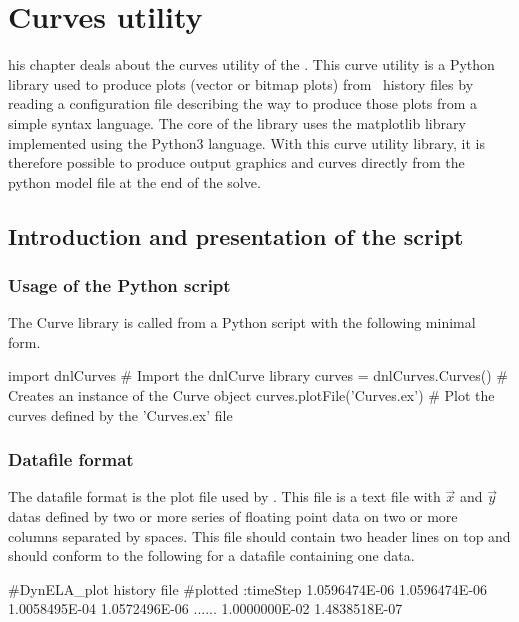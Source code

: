 
\chapter{Curves utility}

\startcontents[chapters]
\printmyminitoc[1]his chapter deals about the curves utility of the \Dynela.
This curve utility is a Python library used to produce plots (vector
or bitmap plots) from \Dynela~history files by reading a configuration
file describing the way to produce those plots from a simple syntax
language. The core of the library uses the matplotlib library implemented
using the Python3 language. With this curve utility library, it is
therefore possible to produce output graphics and curves directly
from the python model file at the end of the solve.

\section{Introduction and presentation of the script}

\subsection{Usage of the Python script}

The Curve library is called from a Python script with the following
minimal form.

\begin{PythonListing}
import dnlCurves              # Import the dnlCurve library
curves = dnlCurves.Curves()   # Creates an instance of the Curve object
curves.plotFile('Curves.ex')  # Plot the curves defined by the 'Curves.ex' file
\end{PythonListing}

\subsection{Datafile format}

The datafile format is the plot file used by \Dynela. This file is
a text file with $\overrightarrow{x}$ and $\overrightarrow{y}$ datas
defined by two or more series of floating point data on two or more
columns separated by spaces. This file should contain two header lines
on top and should conform to the following for a datafile containing
one data.

\begin{PythonListing}
#DynELA_plot history file
#plotted :timeStep 
1.0596474E-06 1.0596474E-06 
1.0058495E-04 1.0572496E-06 
......
1.0000000E-02 1.4838518E-07 
\end{PythonListing}


